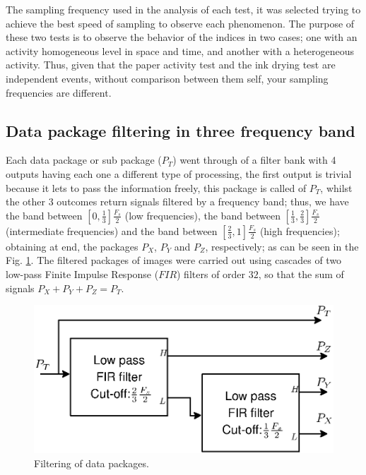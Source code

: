 \documentclass[review]{elsarticle}
\begin{document}
The sampling frequency used in the analysis of each test, 
it was selected  trying to achieve the best speed of sampling to observe each phenomenon. 
The purpose of these two tests is to observe the behavior of the indices in two cases; 
one with an activity homogeneous level in space and time, and another with a heterogeneous activity.
Thus, given that the paper activity test and the ink drying test are independent events, 
without comparison between them self, your sampling frequencies are different.

\subsection{Data package filtering in three frequency band}
\label{subsec:firfilters}
Each data package or sub package ($P_T$) went through of a filter bank with 4 outputs  having each
one a different type of processing, the first output is trivial because it
lets to pass the information freely, this package is called of $P_T$, whilst the other 3 outcomes
return  signals filtered by a frequency band; thus, 
we have the band between $[0,\frac{1}{3}]\frac{F_s}{2}$ (low frequencies),
the band between $[\frac{1}{3},\frac{2}{3}]\frac{F_s}{2}$ (intermediate frequencies) and
the band between $[\frac{2}{3},1]\frac{F_s}{2}$ (high frequencies); obtaining at end, the packages 
$P_X$, $P_Y$ and $P_Z$, respectively; as can be seen in the  Fig. \ref{fig:firfilters}.
The filtered packages of images were carried out using cascades
of two low-pass Finite Impulse Response ($FIR$) filters of order $32$, so that
the sum of signals $P_X+P_Y+P_Z=P_T$.
\begin{figure}[h!]
\centering
\includegraphics[width=0.55\columnwidth]{firfilters.eps}
\caption{Filtering of data packages.}
\label{fig:firfilters}
\end{figure}
\end{document}
